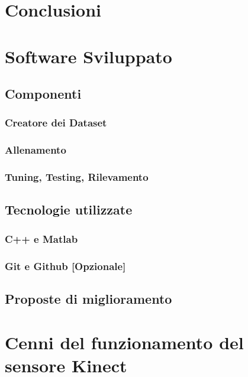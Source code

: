


\chapter{Conclusioni}

\begin{appendices}
    \chapter{Software Sviluppato}
    \label{chap:software}
        \section{Componenti}
            \subsection{Creatore dei Dataset}
            \subsection{Allenamento}
            \subsection{Tuning, Testing, Rilevamento}
        \section{Tecnologie utilizzate}
            \subsection{C++ e Matlab}
            \subsection{Git e Github [Opzionale]}
        \section{Proposte di miglioramento}

    \chapter{Cenni del funzionamento del sensore Kinect}
    \label{chap:kinect_sensor}
\end{appendices}
